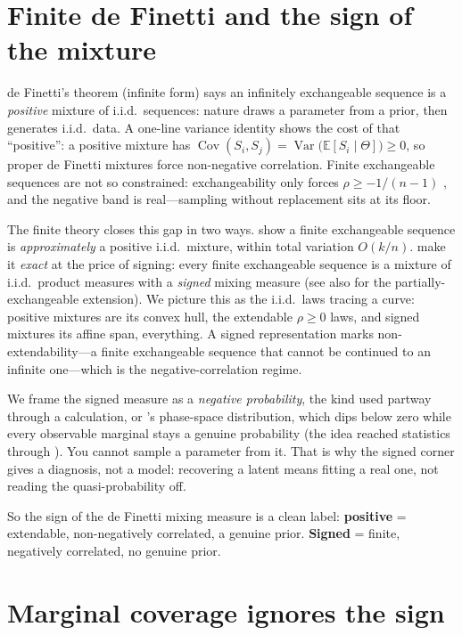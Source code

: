 \documentclass[11pt]{article}
\begin{document}
\section{Finite de Finetti and the sign of the mixture}

de Finetti's theorem (infinite form) says an infinitely exchangeable sequence is a
\emph{positive} mixture of i.i.d.\ sequences: nature draws a parameter from a prior, then
generates i.i.d.\ data. A one-line variance identity shows the cost of that ``positive'': a
positive mixture has $\operatorname{Cov}(S_i,S_j)=\operatorname{Var}\big(\mathbb
E[S_i\mid\Theta]\big)\ge 0$, so proper de Finetti mixtures force non-negative correlation.
Finite exchangeable sequences are not so constrained: exchangeability only forces
$\rho\ge -1/(n-1)$ \citep{aldous1985}, and the negative band is real---sampling without
replacement sits at its floor.

The finite theory closes this gap in two ways. \citet{diaconis1980} show a finite exchangeable
sequence is \emph{approximately} a positive i.i.d.\ mixture, within total variation $O(k/n)$.
\citet{kerns2006} make it \emph{exact} at the price of signing: every finite exchangeable
sequence is a mixture of i.i.d.\ product measures with a \emph{signed} mixing measure (see
also \citealp{leonetti2018} for the partially-exchangeable extension). We picture this as the i.i.d.\ laws tracing a curve: positive mixtures are its convex hull, the
extendable $\rho\ge 0$ laws, and signed mixtures its affine span, everything. A signed
representation marks non-extendability---a finite exchangeable sequence that cannot be continued
to an infinite one---which is the negative-correlation regime.

We frame the signed measure as a \emph{negative probability}, the kind \citet{feynman1987} used
partway through a calculation, or \citet{wigner1932}'s phase-space distribution, which dips
below zero while every observable marginal stays a genuine probability (the idea reached
statistics through \citealp{bartlett1945}). You cannot sample a parameter from it. That is why
the signed corner gives a diagnosis, not a model: recovering a latent means fitting a real one,
not reading the quasi-probability off.

So the sign of the de Finetti mixing measure is a clean label: \textbf{positive} = extendable,
non-negatively correlated, a genuine prior. \textbf{Signed} = finite, negatively correlated,
no genuine prior.

\section{Marginal coverage ignores the sign}
\end{document}
